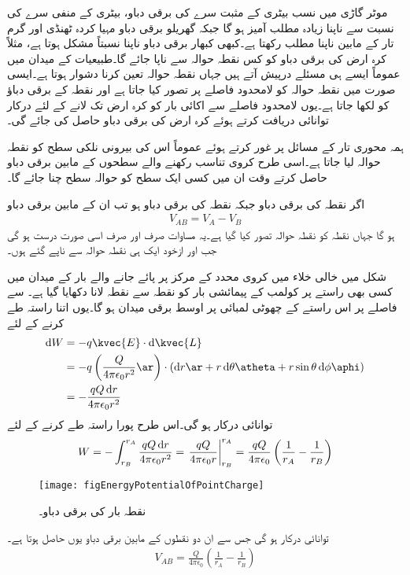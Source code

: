 موٹر گاڑی میں نسب بیٹری کے مثبت سرے کی برقی دباو،  بیٹری کے منفی سرے کی نسبت سے ناپنا زیادہ مطلب آمیز ہو گا جبکہ گھریلو برقی دباو مہیا کردہ ٹھنڈی اور گرم تار کے مابین ناپنا مطلب رکھتا ہے۔کبھی کبھار برقی دباو ناپنا نسبتاً مشکل ہوتا ہے، مثلاً  کرہ ارض  کی برقی دباو کو کس نقطہ حوالہ سے ناپا جائے گا۔طبیعیات کے میدان میں عموماً ایسے ہی مسئلے درپیش آتے ہیں جہاں نقطہ حوالہ تعین کرنا دشوار ہوتا ہے۔ایسی صورت میں نقطہ حوالہ کو لامحدود فاصلے پر تصور کیا جاتا ہے اور نقطہ  کے برقی دباؤ کو  لکھا جاتا ہے۔یوں لامحدود فاصلے سے اکائی بار کو کرہ ارض تک لانے کے لئے درکار توانائی دریافت کرتے ہوئے کرہ ارض کی برقی دباو حاصل کی جائے گی۔

ہمہ محوری تار کے مسائل پر غور کرتے ہوئے عموماً اس کی بیرونی نلکی سطح کو نقطہ حوالہ لیا جاتا ہے۔اسی طرح کروی تناسب رکھنے والے سطحوں کے مابین برقی دباو حاصل کرتے وقت ان میں کسی ایک سطح کو حوالہ سطح چنا جائے گا۔

اگر نقطہ  کی برقی دباو  جبکہ نقطہ  کی برقی دباو  ہو تب ان کے مابین برقی دباو 
\begin{align}
V_{AB}=V_A-V_B
\end{align}
ہو گا جہاں نقطہ  کو نقطہ حوالہ تصور کیا گیا ہے۔یہ مساوات صرف اور صرف اسی صورت درست ہو گی جب  اور   ازخود  ایک ہی نقطہ حوالہ سے ناپے گئے ہوں۔

شکل   میں خالی خلاء میں کروی محدد کے مرکز پر پائے جانے والے بار  کے میدان میں کسی بھی راستے پر   کولمب  کے پیمائشی بار کو نقطہ  سے نقطہ  لانا دکھایا گیا ہے۔ سے  فاصلے پر اس راستے کے چھوٹی لمبائی  پر اوسط برقی میدان  ہو گا۔یوں اتنا راستہ طے کرنے کے لئے
\begin{align*}
\dif W&=- q \kvec{E} \cdot \dif \kvec{L}\\
&=-q \left(\frac{Q}{4\pi \epsilon_0 r^2}\ar \right) \cdot \left(\dif r \ar+r \dif \theta \atheta+r \sin \theta \dif \phi \aphi \right)\\
&=-\frac{q Q \dif r}{4 \pi \epsilon_0 r^2}
\end{align*}
توانائی درکار ہو گی۔اس طرح پورا راستہ طے کرنے کے لئے
\begin{align*}
W=-\int_{r_B}^{r_A} \frac{qQ \dif r}{4 \pi \epsilon_0 r^2}=\left. \frac{qQ}{4\pi \epsilon_0 r}\right|_{r_B}^{r_A}=\frac{qQ}{4\pi \epsilon_0} \left( \frac{1}{r_A}-\frac{1}{r_B} \right)
\end{align*}
%
\begin{figure}
\centering
\texttt{[image: figEnergyPotentialOfPointCharge]}
\caption{نقطہ بار کی برقی دباو۔}
\label{شکل_توانائی_نقطہ_بار_دباو}
\end{figure}
توانائی درکار ہو گی جس سے ان دو نقطوں کے مابین برقی دباو  یوں حاصل ہوتا ہے۔
\begin{align}\label{مساوات_توانائی_نقطہ_بار_کی_دباو}
V_{AB}=\frac{Q}{4\pi \epsilon_0} \left( \frac{1}{r_A}-\frac{1}{r_B} \right)
\end{align}

